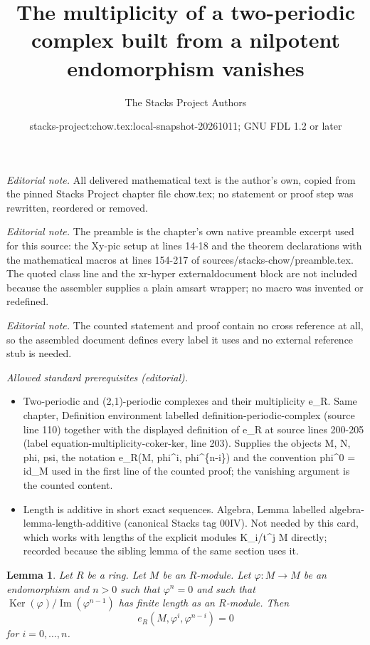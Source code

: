\documentclass[10pt,a4paper]{amsart}
\title{The multiplicity of a two-periodic complex built from a nilpotent endomorphism vanishes}
\author{The Stacks Project Authors}
\date{stacks-project:chow.tex:local-snapshot-20261011; GNU FDL 1.2 or later}
\theoremstyle{plain}
\newtheorem{lemma}[subsection]{Lemma}
\theoremstyle{definition}
\theoremstyle{remark}
\numberwithin{equation}{subsection}
\def\Ker{\mathop{\mathrm{Ker}}}
\def\Im{\mathop{\mathrm{Im}}}
\begin{document}
\maketitle
\noindent\textit{Editorial note.} All delivered mathematical text is the author's own, copied from the pinned Stacks Project chapter file chow.tex; no statement or proof step was rewritten, reordered or removed.\par\medskip
\noindent\textit{Editorial note.} The preamble is the chapter's own native preamble excerpt used for this source: the Xy-pic setup at lines 14-18 and the theorem declarations with the mathematical macros at lines 154-217 of sources/stacks-chow/preamble.tex. The quoted class line and the xr-hyper externaldocument block are not included because the assembler supplies a plain amsart wrapper; no macro was invented or redefined.\par\medskip
\noindent\textit{Editorial note.} The counted statement and proof contain no cross reference at all, so the assembled document defines every label it uses and no external reference stub is needed.\par\medskip
\noindent\textit{Allowed standard prerequisites (editorial).}\begin{itemize}
\item Two-periodic and (2,1)-periodic complexes and their multiplicity e\_R. Same chapter, Definition environment labelled definition-periodic-complex (source line 110) together with the displayed definition of e\_R at source lines 200-205 (label equation-multiplicity-coker-ker, line 203). Supplies the objects M, N, phi, psi, the notation e\_R(M, phi\textasciicircum{}i, phi\textasciicircum{}\{n-i\}) and the convention phi\textasciicircum{}0 = id\_M used in the first line of the counted proof; the vanishing argument is the counted content.
\item Length is additive in short exact sequences. Algebra, Lemma labelled algebra-lemma-length-additive (canonical Stacks tag 00IV). Not needed by this card, which works with lengths of the explicit modules K\_i/t\textasciicircum{}j M directly; recorded because the sibling lemma of the same section uses it.
\end{itemize}\medskip
\begin{lemma}
\label{lemma-powers-period-length-zero}
Let $R$ be a ring. Let $M$ be an $R$-module.
Let $\varphi : M \to M$ be an endomorphism and $n > 0$
such that $\varphi^n = 0$ and such that $\Ker(\varphi)/\Im(\varphi^{n - 1})$
has finite length as an $R$-module.
Then
$$
e_R(M, \varphi^i, \varphi^{n - i}) = 0
$$
for $i = 0, \ldots, n$.
\end{lemma}
\end{document}
